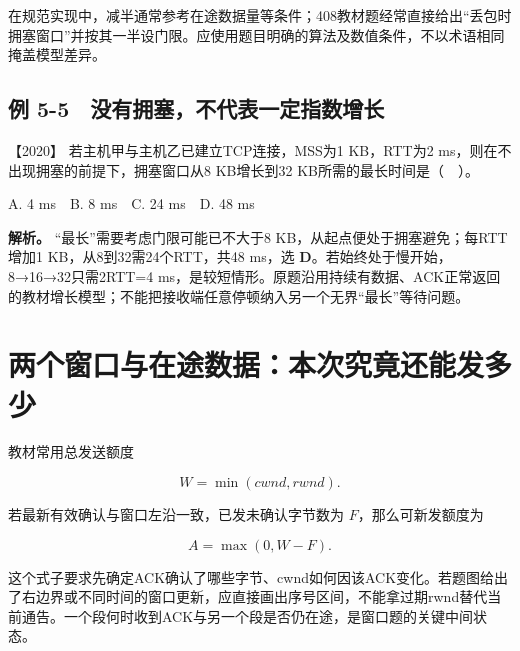 在规范实现中，减半通常参考在途数据量等条件；408教材题经常直接给出``丢包时拥塞窗口''并按其一半设门限。应使用题目明确的算法及数值条件，不以术语相同掩盖模型差异。

\subsection{例 5-5　没有拥塞，不代表一定指数增长}\label{cn-ex5-5}

\noindent{}【2020】 若主机甲与主机乙已建立TCP连接，MSS为1 KB，RTT为2 ms，则在不出现拥塞的前提下，拥塞窗口从8 KB增长到32 KB所需的最长时间是（　）。

A. 4 ms　B. 8 ms　C. 24 ms　D. 48 ms


\textbf{解析。} ``最长''需要考虑门限可能已不大于8 KB，从起点便处于拥塞避免；每RTT增加1 KB，从8到32需24个RTT，共48 ms，选 \textbf{D}。若始终处于慢开始，8→16→32只需2RTT=4 ms，是较短情形。原题沿用持续有数据、ACK正常返回的教材增长模型；不能把接收端任意停顿纳入另一个无界``最长''等待问题。

\section{两个窗口与在途数据：本次究竟还能发多少}\label{cn-05-09}

教材常用总发送额度

\[W=\min(cwnd,rwnd).\]

若最新有效确认与窗口左沿一致，已发未确认字节数为 \(F\)，那么可新发额度为

\[A=\max(0,W-F).\]

这个式子要求先确定ACK确认了哪些字节、cwnd如何因该ACK变化。若题图给出了右边界或不同时间的窗口更新，应直接画出序号区间，不能拿过期rwnd替代当前通告。一个段何时收到ACK与另一个段是否仍在途，是窗口题的关键中间状态。

